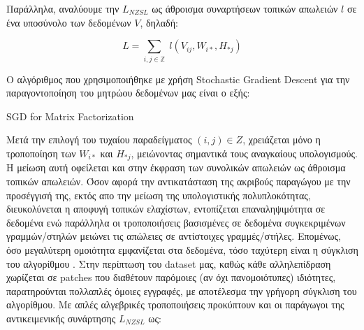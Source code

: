 Παράλληλα, αναλύουμε την $L_{NZSL}$ ως άθροισμα συναρτήσεων τοπικών απωλειών $l$ σε ένα υποσύνολο των δεδομένων $V$, δηλαδή: 

{\Large
\begin{equation}
    L = \sum_{i,j \in \mathbb{Z}} \; l(V_{ij} , W_{i*}, H_{*j})
\end{equation}}

Ο αλγόριθμος που χρησιμοποιήθηκε με χρήση Stochastic Gradient Descent για την παραγοντοποίηση του μητρώου δεδομένων μας είναι ο εξής:

\medskip
\begin{algorithm}[H]
\SetAlgoLined
\DontPrintSemicolon
{}
\caption{SGD for Matrix Factorization \label{SGDMF}}
\end{algorithm}

\bigskip
Mετά την επιλογή του τυχαίου παραδείγματος $(i,j) \in Z$, χρειάζεται μόνο η τροποποίηση των $W_{i*}$ και $H_{*j}$, μειώνοντας σημαντικά τους αναγκαίους υπολογισμούς. Η μείωση αυτή οφείλεται και στην έκφραση των συνολικών απωλειών ως άθροισμα τοπικών απωλειών. Όσον αφορά την αντικατάσταση της ακριβούς παραγώγου με την προσέγγισή της, εκτός απο την μείωση της υπολογιστικής πολυπλοκότητας, διευκολύνεται η αποφυγή τοπικών ελαχίστων, εντοπίζεται επαναληψιμότητα σε δεδομένα ενώ παράλληλα οι τροποποιήσεις βασισμένες σε δεδομένα συγκεκριμένων γραμμών/στηλών μειώνει τις απώλειες σε αντίστοιχες γραμμές/στήλες. Επομένως, όσο μεγαλύτερη ομοιότητα εμφανίζεται στα δεδομένα, τόσο ταχύτερη είναι η σύγκλιση του αλγορίθμου \cite{Bottou2007}. Στην περίπτωση του dataset μας, καθώς κάθε αλληλεπίδραση χωρίζεται σε patches που διαθέτουν παρόμοιες (αν όχι πανομοιότυπες) ιδιότητες, παρατηρούνται πολλαπλές όμοιες εγγραφές, με αποτέλεσμα την γρήγορη σύγκλιση του αλγορίθμου. Με απλές αλγεβρικές τροποποιήσεις προκύπτουν και οι παράγωγοι της αντικειμενικής συνάρτησης $L_{NZSL}$ ως:

